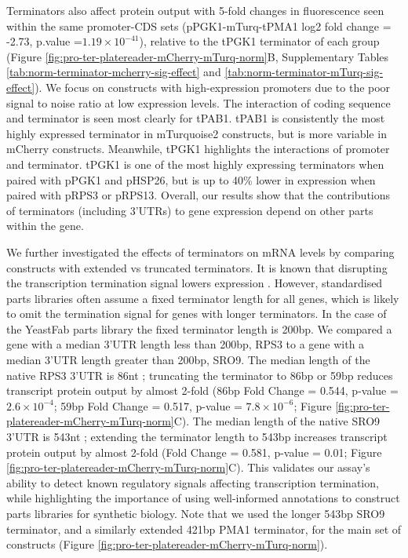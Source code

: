 \documentclass[../main.tex]{subfiles}
\begin{document}
Terminators also affect protein output with 5-fold changes in fluorescence seen within the same promoter-CDS sets (pPGK1-mTurq-tPMA1 log2 fold change = -2.73, p.value =\(1.19 \times 10^{-41}\)), relative to the tPGK1 terminator of each group (Figure \ref{fig:pro-ter-platereader-mCherry-mTurq-norm}B, Supplementary Tables \ref{tab:norm-terminator-mcherry-sig-effect} and \ref{tab:norm-terminator-mTurq-sig-effect}).
We focus on constructs with high-expression promoters due to the poor signal to noise ratio at low expression levels.
The interaction of coding sequence and terminator is seen most clearly for tPAB1.
tPAB1 is consistently the most highly expressed terminator in mTurquoise2 constructs, but is more variable in mCherry constructs.
Meanwhile, tPGK1 highlights the interactions of promoter and terminator.
tPGK1 is one of the most highly expressing terminators when paired with pPGK1 and pHSP26, but is up to 40\% lower in expression when paired with pRPS3 or pRPS13.
Overall, our results show that the contributions of terminators (including 3'UTRs) to gene expression depend on other parts within the gene.

We further investigated the effects of terminators on mRNA levels by comparing constructs with extended vs truncated terminators.
It is known that disrupting the transcription termination signal lowers expression \parencite{Shalem2015, Guo1996}.
However, standardised parts libraries often assume a fixed terminator length for all genes, which is likely to omit the termination signal for genes with longer terminators.
In the case of the YeastFab parts library \parencite{Guo2015} the fixed terminator length is 200bp.
We compared a gene with a median 3'UTR length less than 200bp, RPS3 to a gene with a median 3'UTR length greater than 200bp, SRO9.
The median length of the native RPS3 3'UTR is 86nt \parencite{Pelechano2013}; truncating the terminator to 86bp or 59bp reduces transcript protein output by almost 2-fold (86bp Fold Change = 0.544, p-value = \(2.6 \times 10^{-4}\); 59bp Fold Change = 0.517, p-value = \(7.8 \times 10^{-6}\); Figure \ref{fig:pro-ter-platereader-mCherry-mTurq-norm}C).
The median length of the native SRO9 3'UTR is 543nt \parencite{Pelechano2013}; extending the terminator length to 543bp increases transcript protein output by almost 2-fold (Fold Change = 0.581, p-value = 0.01; Figure \ref{fig:pro-ter-platereader-mCherry-mTurq-norm}C).
This validates our assay's ability to detect known regulatory signals affecting transcription termination, while highlighting the importance of using well-informed annotations to construct parts libraries for synthetic biology.
Note that we used the longer 543bp SRO9 terminator, and a similarly extended 421bp PMA1 terminator, for the main set of constructs (Figure \ref{fig:pro-ter-platereader-mCherry-mTurq-norm}).
\end{document}
